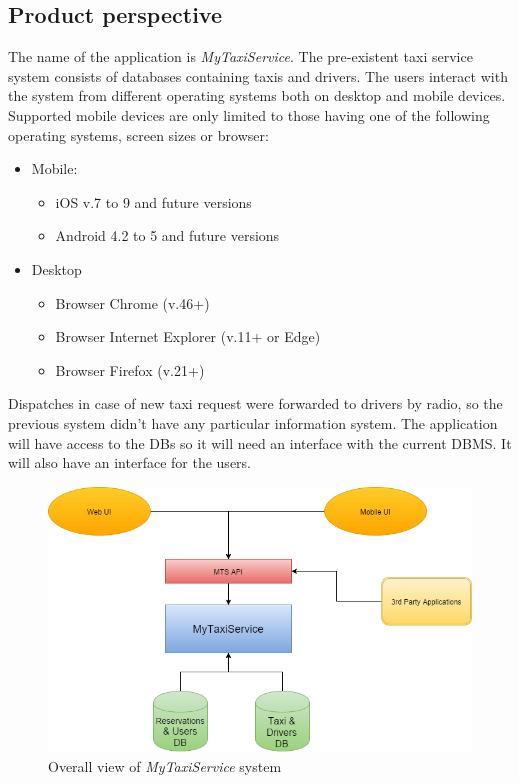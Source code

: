 \documentclass{article}
\begin{document}
\subsection{Product perspective}
The name of the application is \textit{MyTaxiService}.
The pre-existent taxi service system consists of databases containing taxis and drivers.
The users interact with the system from different operating systems both on desktop and mobile devices.
Supported mobile devices are only limited to those having one of the following operating systems, screen sizes or browser:
\begin{itemize}
\item Mobile:
\begin{itemize}
\item iOS v.7 to 9 and future versions
\item Android 4.2 to 5 and future versions
\end{itemize}
\item Desktop
\begin{itemize}
\item Browser Chrome (v.46+)
\item Browser Internet Explorer (v.11+ or Edge)
\item Browser Firefox (v.21+)
\end{itemize}
\end{itemize}
Dispatches in case of new taxi request were forwarded to drivers by radio, so the previous system didn't have any particular information system.
The application will have access to the DBs so it will need an interface with the current DBMS.
It will also have an interface for the users.


\begin{figure}[h!]
\begin{center}
\includegraphics[width=0.84\columnwidth]{Blocchi Diagram (1)/Blocchi Diagram (1)}
\caption{Overall view of \textit{MyTaxiService} system}
\end{center}
\end{figure}
\end{document}
